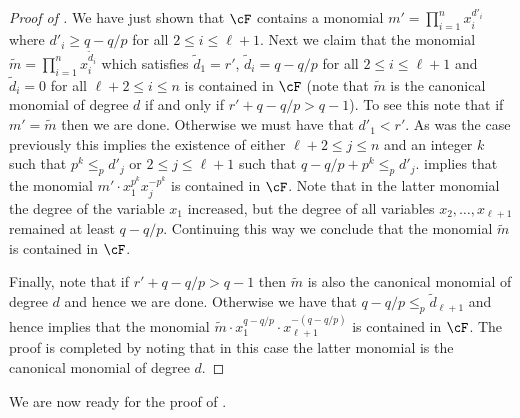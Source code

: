 \begin{proof}[Proof of ]
We have just shown that $\cF$ contains a monomial $m' = \prod_{i=1}^n x_i^{d'_i}$ where $d'_i \geq q-q/p$ for all $2 \leq i \leq \ell+1$.
Next we claim that the monomial ${\widetilde m} = \prod_{i=1}^n x_i^{{\widetilde d}_i}$ which satisfies
${\widetilde d}_1 = r'$, ${\widetilde d}_i=q-q/p$ for all $2 \leq i \leq \ell+1$ and ${\widetilde d}_i =0$ for all $\ell+2 \leq i \leq n$ is contained in $\cF$ (note that $\widetilde m$ is the canonical monomial of degree $d$ if and only if $r' + q-q/p > q-1$). To see this note that if $m' = \widetilde m$ then we are done.
Otherwise we must have that $d'_1 < r'$. As was the case previously this implies the existence of either $\ell+2 \leq j \leq n$ and an integer $k$ such that $p^k \leq_p d'_j$
or $2 \leq j \leq \ell+1$ such that $q-q/p + p^k \leq_p d'_j$.  implies that the monomial $m' \cdot x_1^{p^k} x_j^{-p^k}$ is contained
in $\cF$. Note that in  the latter monomial the degree of the variable $x_1$ increased, but the degree of all variables $x_2,\ldots,x_{\ell+1}$ remained at least $q-q/p$. Continuing this way we conclude that
the monomial $\widetilde m $ is contained in $\cF$.

Finally, note that if $r' +q-q/p >q-1$ then $\widetilde m $ is also the canonical monomial
of degree $d$ and hence we are done. Otherwise we have that $q-q/p \leq_p {\widetilde d}_{\ell+1}$ and hence  implies that the monomial
$ {\widetilde m} \cdot x_1^{q-q/p} \cdot x_{\ell+1}^{-(q-q/p)}$ is contained in $\cF$. The proof is completed by noting that in this case the latter monomial is the canonical monomial of degree
$d$.
\end{proof}

We are now ready for the proof of .

